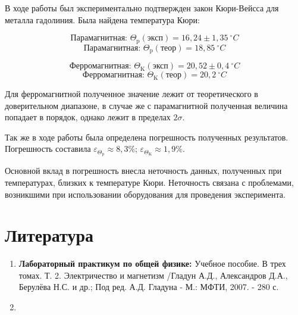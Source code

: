 \documentclass[a4paper, 12pt]{article}%
\begin{document}
В ходе работы был экспериментально подтвержден закон Кюри-Вейсса для металла гадолиния. Была найдена температура Кюри:

\[ \text{Парамагнитная: } \Theta_{\mathrm{p}} (\text{эксп}) = 16,24 \pm 1,35\ ^{\circ}C\]
\[ \text{Парамагнитная: } \Theta_{\mathrm{p}} (\text{теор}) = 18,85\ ^{\circ}C\]


\[ \text{Ферромагнитная: } \Theta_{\mathrm{K}} (\text{эксп}) = 20,52 \pm 0,4\ ^{\circ}C\]
\[ \text{Ферромагнитная: } \Theta_{\mathrm{K}} (\text{теор}) = 20,2\ ^{\circ}C\]
 
Для ферромагнитной полученное значение лежит от теоретического в доверительном диапазоне, в случае же с парамагнитной полученная величина попадает в порядок, однако лежит в пределах $2\sigma$.

Так же в ходе работы была определена погрешность полученных результатов. Погрешность составила $\varepsilon_{\Theta_{\mathrm{p}}} \approx 8,3 \%$; $\varepsilon_{\Theta_{\mathrm{K}}} \approx 1,9\%$.

Основной вклад в погрешность внесла неточность данных, полученных при температурах, близких к температуре Кюри. Неточность связана с проблемами, возникшими при использовании оборудования для проведения эксперимента.

 
\section{Литература}

\begin{enumerate}

\item \textbf{Лабораторный практикум по общей физике:} Учебное пособие. В трех томах. Т. 2. Электричество и магнетизм /Гладун А.Д., Александров Д.А., Берулёва Н.С. и др.; Под ред. А.Д. Гладуна - М.: МФТИ, 2007. - 280 с.

\item {}

\end{enumerate}		
		
\end{document}
